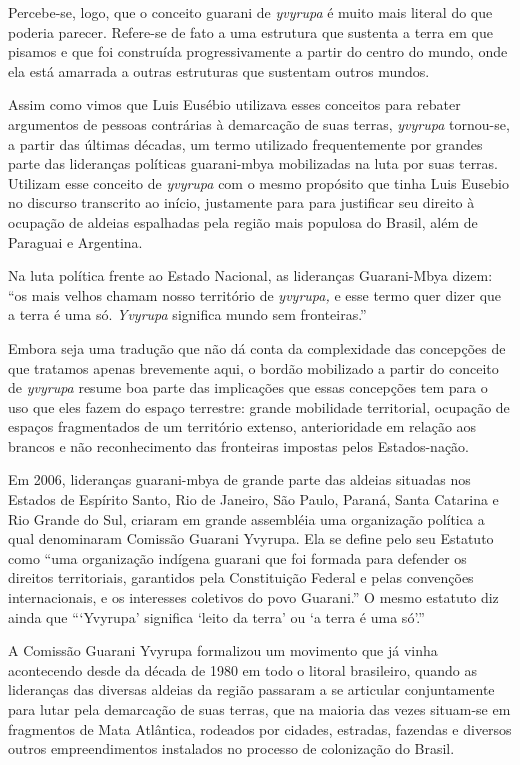 Percebe-se, logo, que o conceito guarani de \emph{yvyrupa} é muito mais
literal do que poderia parecer. Refere-se de fato a uma estrutura que
sustenta a terra em que pisamos e que foi construída progressivamente a
partir do centro do mundo, onde ela está amarrada a outras estruturas
que sustentam outros mundos.

Assim como vimos que Luis Eusébio utilizava esses conceitos para rebater
argumentos de pessoas contrárias à demarcação de suas terras,
\emph{yvyrupa} tornou-se, a partir das últimas décadas, um termo
utilizado frequentemente por grandes parte das lideranças políticas
guarani-mbya mobilizadas na luta por suas terras. Utilizam esse conceito
de \emph{yvyrupa} com o mesmo propósito que tinha Luis Eusebio no
discurso transcrito ao início, justamente para para justificar seu
direito à ocupação de aldeias espalhadas pela região mais populosa do
Brasil, além de Paraguai e Argentina.

Na luta política frente ao Estado Nacional, as lideranças Guarani-Mbya
dizem: ``os mais velhos chamam nosso território de \emph{yvyrupa,} e
esse termo quer dizer que a terra é uma só. \emph{Yvyrupa} significa
mundo sem fronteiras.''

Embora seja uma tradução que não dá conta da complexidade das concepções
de que tratamos apenas brevemente aqui, o bordão mobilizado a partir do
conceito de \emph{yvyrupa} resume boa parte das implicações que essas
concepções tem para o uso que eles fazem do espaço terrestre: grande
mobilidade territorial, ocupação de espaços fragmentados de um
território extenso, anterioridade em relação aos brancos e não
reconhecimento das fronteiras impostas pelos Estados-nação.

Em 2006, lideranças guarani-mbya de grande parte das aldeias situadas
nos Estados de Espírito Santo, Rio de Janeiro, São Paulo, Paraná, Santa
Catarina e Rio Grande do Sul, criaram em grande assembléia uma
organização política a qual denominaram Comissão Guarani Yvyrupa. Ela se
define pelo seu Estatuto como ``uma organização indígena guarani que foi
formada para defender os direitos territoriais, garantidos pela
Constituição Federal e pelas convenções internacionais, e os interesses
coletivos do povo Guarani.'' O mesmo estatuto diz ainda que ```Yvyrupa'
significa `leito da terra' ou `a terra é uma só'.''

A Comissão Guarani Yvyrupa formalizou um movimento que já vinha
acontecendo desde da década de 1980 em todo o litoral brasileiro, quando
as lideranças das diversas aldeias da região passaram a se articular
conjuntamente para lutar pela demarcação de suas terras, que na maioria
das vezes situam-se em fragmentos de Mata Atlântica, rodeados por
cidades, estradas, fazendas e diversos outros empreendimentos instalados
no processo de colonização do Brasil.

